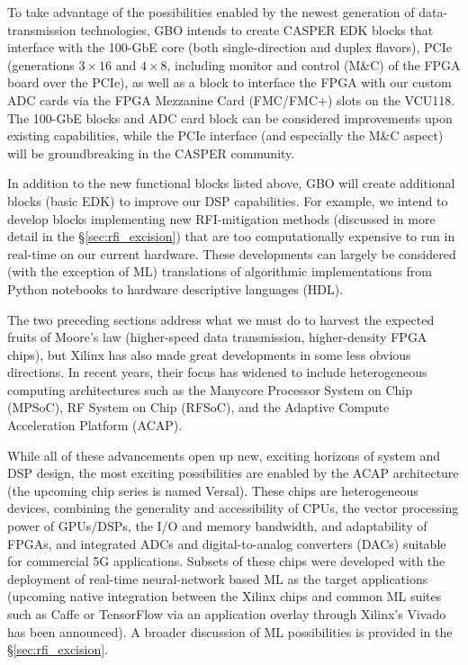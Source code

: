 \documentclass[10pt]{myNSF}
\begin{document}
 To take advantage of the
possibilities enabled by the newest generation of data-transmission
technologies, GBO intends to create CASPER EDK blocks that interface
with the 100-GbE core (both single-direction and duplex flavors), PCIe
(generations $3 \times 16$ and $4 \times 8$, including monitor and
control (M\&C) of the FPGA board over the PCIe), as well as a block to
interface the FPGA with our custom ADC cards via the FPGA Mezzanine
Card (FMC/FMC+) slots on the VCU118. The 100-GbE blocks and ADC card
block can be considered improvements upon existing capabilities, while
the PCIe interface (and especially the M\&C aspect) will be
groundbreaking in the CASPER community.

 In addition to the new functional
blocks listed above, GBO will create additional blocks (basic EDK) to
improve our DSP capabilities. For example, we intend to develop blocks
implementing new RFI-mitigation methods (discussed in more detail in
the \S\ref{sec:rfi_excision}) that are too computationally expensive
to run in real-time on our current hardware. These developments can
largely be considered (with the exception of ML) translations of
algorithmic implementations from Python notebooks to hardware
descriptive languages (HDL).

 The two preceding sections
address what we must do to harvest the expected fruits of Moore's law
(higher-speed data transmission, higher-density FPGA chips), but
Xilinx has also made great developments in some less obvious
directions. In recent years, their focus has widened to include
heterogeneous computing architectures such as the Manycore Processor
System on Chip (MPSoC), RF System on Chip (RFSoC), and the Adaptive
Compute Acceleration Platform (ACAP).

While all of these advancements open up new, exciting horizons of
system and DSP design, the most exciting possibilities are enabled by
the ACAP architecture (the upcoming chip series is named
Versal). These chips are heterogeneous devices, combining the
generality and accessibility of CPUs, the vector processing power of
GPUs/DSPs, the I/O and memory bandwidth, and adaptability of FPGAs,
and integrated ADCs and digital-to-analog converters (DACs) suitable
for commercial 5G applications. Subsets of these chips were developed
with the deployment of real-time neural-network based ML as the target
applications (upcoming native integration between the Xilinx chips and
common ML suites such as Caffe or TensorFlow via an application
overlay through Xilinx’s Vivado has been announced). A broader
discussion of ML possibilities is provided in the
\S\ref{sec:rfi_excision}.
\end{document}
